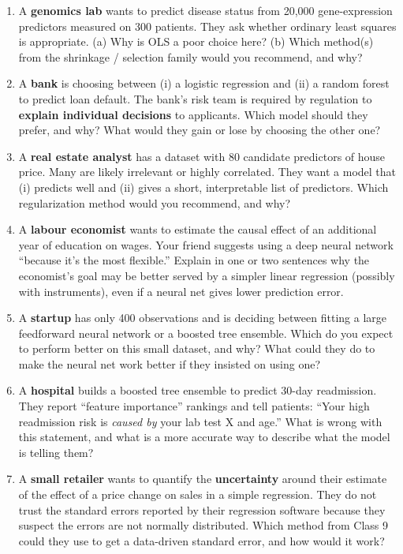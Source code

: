 \documentclass[11pt]{article}
\begin{document}
\begin{enumerate}[leftmargin=*, resume]

\item A \textbf{genomics lab} wants to predict disease status from 20{,}000 gene-expression predictors measured on 300 patients. They ask whether ordinary least squares is appropriate. (a) Why is OLS a poor choice here? (b) Which method(s) from the shrinkage / selection family would you recommend, and why?

\item A \textbf{bank} is choosing between (i) a logistic regression and (ii) a random forest to predict loan default. The bank's risk team is required by regulation to \textbf{explain individual decisions} to applicants. Which model should they prefer, and why? What would they gain or lose by choosing the other one?

\item A \textbf{real estate analyst} has a dataset with 80 candidate predictors of house price. Many are likely irrelevant or highly correlated. They want a model that (i) predicts well and (ii) gives a short, interpretable list of predictors. Which regularization method would you recommend, and why?

\item A \textbf{labour economist} wants to estimate the causal effect of an additional year of education on wages. Your friend suggests using a deep neural network ``because it's the most flexible.'' Explain in one or two sentences why the economist's goal may be better served by a simpler linear regression (possibly with instruments), even if a neural net gives lower prediction error.

\item A \textbf{startup} has only 400 observations and is deciding between fitting a large feedforward neural network or a boosted tree ensemble. Which do you expect to perform better on this small dataset, and why? What could they do to make the neural net work better if they insisted on using one?

\item A \textbf{hospital} builds a boosted tree ensemble to predict 30-day readmission. They report ``feature importance'' rankings and tell patients: ``Your high readmission risk is \emph{caused by} your lab test X and age.'' What is wrong with this statement, and what is a more accurate way to describe what the model is telling them?

\item A \textbf{small retailer} wants to quantify the \textbf{uncertainty} around their estimate of the effect of a price change on sales in a simple regression. They do not trust the standard errors reported by their regression software because they suspect the errors are not normally distributed. Which method from Class 9 could they use to get a data-driven standard error, and how would it work?


\end{enumerate}
\end{document}
